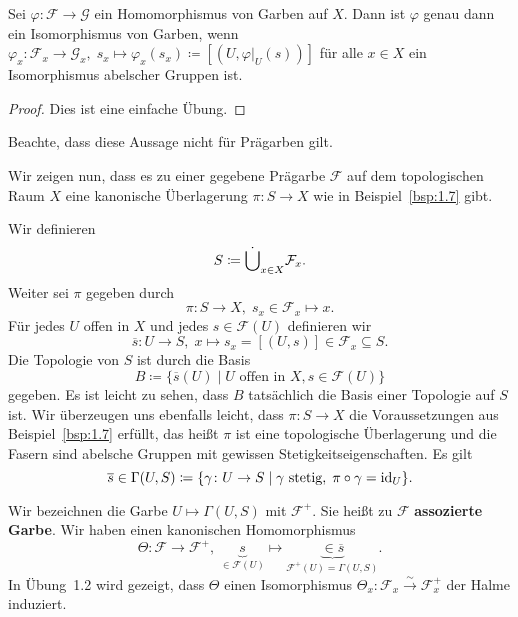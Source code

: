 \begin{prop}
	Sei $\varphi \colon \mathcal{F} \to \mathcal{G}$ ein Homomorphismus von Garben auf $X$. Dann ist $\varphi$ genau dann ein Isomorphismus von Garben, wenn $\varphi_x \colon \mathcal{F}_x \to \mathcal{G}_x,\; s_x \mapsto \varphi_x(s_x) \coloneqq [(U,\varphi\vert_U(s))]$ für alle $x \in X$ ein Isomorphismus abelscher Gruppen ist.
	\begin{proof}
		Dies ist eine einfache Übung.
	\end{proof}
	Beachte, dass diese Aussage nicht für Prägarben gilt.
\end{prop}

\begin{bem}
\label{bem:1.15}
	Wir zeigen nun, dass es zu einer gegebene Prägarbe $\mathcal{F}$ auf dem topologischen Raum $X$ eine kanonische Überlagerung $\pi\colon S \to X$ wie in Beispiel~\ref{bsp:1.7} gibt.

	Wir definieren
	\[
		S\coloneqq \mathbin{\dot{\bigcup}}_{x\in X} \mathcal{F}_x.
	\]
	Weiter sei $\pi$ gegeben durch
	\[
		\pi\colon S \to X,\; s_x\in \mathcal{F}_x \mapsto x.
	\]
	Für jedes $U$ offen in $X$ und jedes $s \in \mathcal{F}(U)$ definieren wir
	\[
		\overline{s}\colon U \to S,\; x \mapsto s_x = [(U,s)] \in \mathcal{F}_x \subseteq S.
	\]
	Die Topologie von $S$ ist durch die Basis
	\[
		B \coloneqq \{\overline{s}(U) \mid U \text{ offen in } X, s \in \mathcal{F}(U)\}
	\]
	gegeben. Es ist leicht zu sehen, dass $B$ tatsächlich die Basis einer Topologie auf $S$ ist. Wir überzeugen uns ebenfalls leicht, dass $\pi\colon S \to X$ die Voraussetzungen aus Beispiel~\ref{bsp:1.7} erfüllt, das heißt $\pi$ ist eine topologische Überlagerung und die Fasern sind abelsche Gruppen mit gewissen Stetigkeitseigenschaften. Es gilt
	\[
		\overline{s} \in \Gamma(U,S) \coloneqq \{\gamma\colon U \to S \mid \gamma \text{ stetig},\; \pi \circ \gamma = \operatorname{id}_U\}.
	\]
\end{bem}

\begin{defn}
	Wir bezeichnen die Garbe $U \mapsto \Gamma(U,S)$ mit $\mathcal{F}^+$. Sie heißt zu $\mathcal{F}$ \textbf{assozierte Garbe}. Wir haben einen kanonischen Homomorphismus
	\[
		\Theta\colon \mathcal{F} \to \mathcal{F}^+,\; \underbrace{s}_{\in \mathcal{F}(U)} \mapsto \underbrace{\in\overline{s}}_{\mathcal{F}^+(U)=\Gamma(U,S)}.
	\]
	In Übung~1.2 wird gezeigt, dass $\Theta$ einen Isomorphismus $\Theta_x \colon \mathcal{F}_x \overset{\sim}{\to} \mathcal{F}^+_x$ der Halme induziert.
\end{defn}

